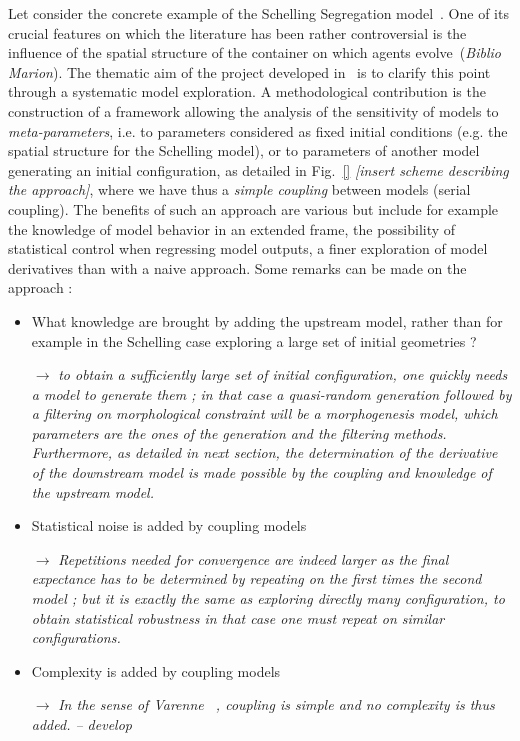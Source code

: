 Let consider the concrete example of the Schelling Segregation model~\cite{schelling1971dynamic}. One of its crucial features on which the literature has been rather controversial is the influence of the spatial structure of the container on which agents evolve~(\textit{Biblio Marion}). The thematic aim of the project developed in~\cite{cottineau2015revisiting} is to clarify this point through a systematic model exploration. A methodological contribution is the construction of a framework allowing the analysis of the sensitivity of models to \emph{meta-parameters}, i.e. to parameters considered as fixed initial conditions (e.g. the spatial structure for the Schelling model), or to parameters of another model generating an initial configuration, as detailed in Fig.~\ref{} \textit{[insert scheme describing the approach]}, where we have thus a \emph{simple coupling} between models (serial coupling). The benefits of such an approach are various but include for example the knowledge of model behavior in an extended frame, the possibility of statistical control when regressing model outputs, a finer exploration of model derivatives than with a naive approach. Some remarks can be made on the approach :
\begin{itemize}
\item What knowledge are brought by adding the upstream model, rather than for example in the Schelling case exploring a large set of initial geometries ? 

$\rightarrow$ \textit{to obtain a sufficiently large set of initial configuration, one quickly needs a model to generate them ; in that case a quasi-random generation followed by a filtering on morphological constraint will be a morphogenesis model, which parameters are the ones of the generation and the filtering methods. Furthermore, as detailed in next section, the determination of the derivative of the downstream model is made possible by the coupling and knowledge of the upstream model.}
\item Statistical noise is added by coupling models

$\rightarrow$ \textit{Repetitions needed for convergence are indeed larger as the final expectance has to be determined by repeating on the first times the second model ; but it is exactly the same as exploring directly many configuration, to obtain statistical robustness in that case one must repeat on similar configurations.}

\item Complexity is added by coupling models

$\rightarrow$ \textit{In the sense of Varenne~\cite{varenne2010framework} , coupling is simple and no complexity is thus added. -- develop}


\end{itemize}
 









